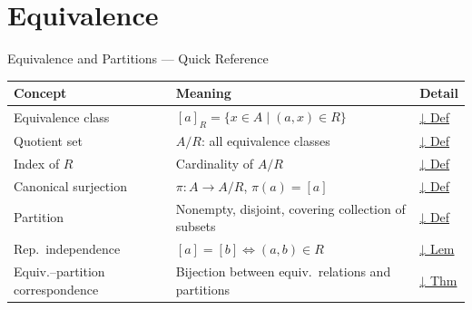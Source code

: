 \section{Equivalence}


\begin{toolkitbox}{Equivalence and Partitions — Quick Reference}
\small
\begin{tabular}{l l l}
\toprule
\textbf{Concept} & \textbf{Meaning} & \textbf{Detail} \\
\midrule
Equivalence class  & $[a]_R = \{x \in A \mid (a,x)\in R\}$                        & \hyperref[def:equiv-class]{↓ Def} \\
Quotient set       & $A/R$: all equivalence classes                                & \hyperref[def:quotient-set]{↓ Def} \\
Index of $R$       & Cardinality of $A/R$                                          & \hyperref[def:index]{↓ Def} \\
Canonical surjection & $\pi : A \to A/R$, $\pi(a) = [a]$                          & \hyperref[def:canonical-surj]{↓ Def} \\
Partition          & Nonempty, disjoint, covering collection of subsets            & \hyperref[def:partition]{↓ Def} \\
Rep.\ independence & $[a]=[b] \iff (a,b)\in R$                                    & \hyperref[lem:rep-independence]{↓ Lem} \\
Equiv.--partition correspondence & Bijection between equiv.\ relations and partitions & \hyperref[thm:equiv-partition]{↓ Thm} \\
\bottomrule
\end{tabular}
\end{toolkitbox}


